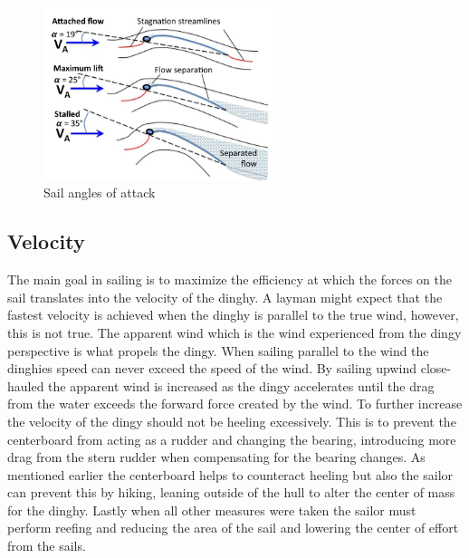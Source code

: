 \begin{figure}[H]
\centering
\includegraphics[width=0.6\textwidth]{Figures/max_lift.jpg}
\caption{Sail angles of attack}
\label{max_liftl}
\end{figure}
\subsection{Velocity}
The main goal in sailing is to maximize the efficiency at which the forces on the sail translates into the velocity of the dinghy. A layman might expect that the fastest velocity is achieved when the dinghy is parallel to the true wind, however, this is not true. The apparent wind which is the wind experienced from the dingy perspective is what propels the dingy. When sailing parallel to the wind the dinghies speed can never exceed the speed of the wind\cite{sail-force}. By sailing upwind close-hauled the apparent wind is increased as the dingy accelerates until the drag from the water exceeds the forward force created by the wind. To further increase the velocity of the dingy should not be heeling excessively. This is to prevent the centerboard from acting as a rudder and changing the bearing, introducing more drag from the stern rudder when compensating for the bearing changes. As mentioned earlier the centerboard helps to counteract heeling but also the sailor can prevent this by hiking, leaning outside of the hull to alter the center of mass for the dinghy. Lastly when all other measures were taken the sailor must perform reefing and reducing the area of the sail and lowering the center of effort from the sails.
